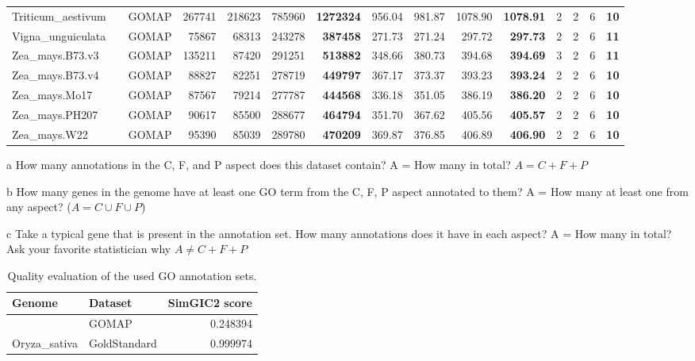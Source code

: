 \documentclass[utf8]{frontiersSCNS}
\begin{document}
\begin{table}[t]
{\begin{threeparttable}
\begin{tabular}{lrlrrr>{\bfseries}r|rrr>{\bfseries}r|rrr>{\bfseries}r}
\rowcolor{gray!6}  Triticum\_aestivum &  & GOMAP & 267741 & 218623 & 785960 & 1272324 & 956.04 & 981.87 & 1078.90 & 1078.91 & 2 & 2 & 6 & 10\\

Vigna\_unguiculata &  & GOMAP & 75867 & 68313 & 243278 & 387458 & 271.73 & 271.24 & 297.72 & 297.73 & 2 & 2 & 6 & 11\\

\rowcolor{gray!6}  Zea\_mays.B73.v3 &  & GOMAP & 135211 & 87420 & 291251 & 513882 & 348.66 & 380.73 & 394.68 & 394.69 & 3 & 2 & 6 & 11\\

Zea\_mays.B73.v4 &  & GOMAP & 88827 & 82251 & 278719 & 449797 & 367.17 & 373.37 & 393.23 & 393.24 & 2 & 2 & 6 & 10\\

\rowcolor{gray!6}  Zea\_mays.Mo17 &  & GOMAP & 87567 & 79214 & 277787 & 444568 & 336.18 & 351.05 & 386.19 & 386.20 & 2 & 2 & 6 & 10\\

Zea\_mays.PH207 &  & GOMAP & 90617 & 85500 & 288677 & 464794 & 351.70 & 367.62 & 405.56 & 405.57 & 2 & 2 & 6 & 10\\

\rowcolor{gray!6}  Zea\_mays.W22 & \multirow{-15}{*}{\raggedleft\arraybackslash 100} & GOMAP & 95390 & 85039 & 289780 & 470209 & 369.87 & 376.85 & 406.89 & 406.90 & 2 & 2 & 6 & 10\\
\bottomrule
\end{tabular}
\begin{tablenotes}
\item[a] How many annotations in the C, F, and P aspect does this dataset contain? A = How many in total? $A = C + F + P$
\item[b] How many genes in the genome have at least one GO term from the C, F, P aspect annotated to them? A = How many at least one from any aspect? ($A = C \cup F \cup P$)
\item[c] Take a typical gene that is present in the annotation set. How many annotations does it have in each aspect? A = How many in total? Ask your favorite statistician why $A \neq C + F +P$
\end{tablenotes}
\end{threeparttable}}
\end{table}

\begin{table}[t]

\caption{\label{tab:quality-table}Quality evaluation of the used GO annotation sets.}
\centering
\begin{tabular}{llr}
\toprule
Genome & Dataset & SimGIC2 score\\
\midrule
\rowcolor{gray!6}   & GOMAP & 0.248394\\

\multirow{-2}{*}{\raggedright\arraybackslash Oryza\_sativa} & GoldStandard & 0.999974\\
\bottomrule
\end{tabular}
\end{table}
\end{document}
